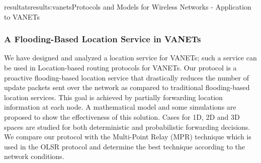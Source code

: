 \documentclass{ra2016}
\begin{document}
\begin{module}{resultats}{results:vanets}{Protocols and Models for Wireless Networks - Application to VANETs}
%


\subsubsection{A Flooding-Based Location Service in VANETs}

\begin{participants}
\end{participants}

We have designed and analyzed a location service for VANETs; 
such a service can be used in Location-based routing protocols for 
VANETs. Our protocol is  a proactive
flooding-based location service that drastically reduces the
number of update packets sent over the network as compared to
traditional flooding-based location services. This goal is achieved
by partially forwarding location information at each node. A
mathematical model and some simulations are proposed to show
the effectiveness of this solution. Cases for 1D, 2D and 3D spaces
are studied for both deterministic and probabilistic forwarding
decisions. We compare our protocol with the Multi-Point Relay (MPR) 
technique which is used in the OLSR protocol and determine the best  technique 
according to the network conditions.  


\end{module}
\end{document}
